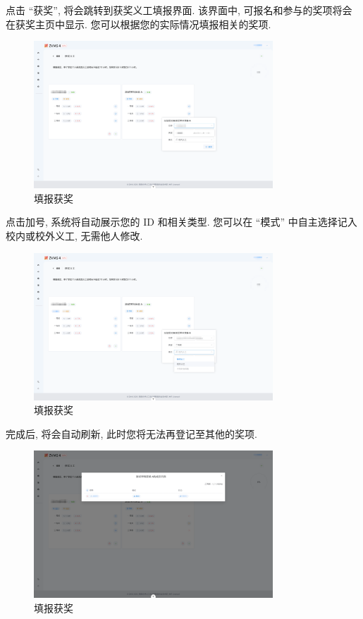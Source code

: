 \documentclass{article}
\begin{document}
点击 ``获奖'', 将会跳转到获奖义工填报界面. 该界面中, 可报名和参与的奖项将会在获奖主页中显示. 您可以根据您的实际情况填报相关的奖项.

\begin{figure}[H]
  \centering
  \includegraphics[width=0.8\textwidth]{../assets/image-20240303162655378.png}
  \caption{填报获奖}
  \label{fig:trophy}
\end{figure}

点击加号, 系统将自动展示您的 $\mathrm{ID}$ 和相关类型. 您可以在 ``模式'' 中自主选择记入校内或校外义工, 无需他人修改.

\begin{figure}[H]
  \centering
  \includegraphics[width=0.8\textwidth]{../assets/image-20240303162827568.png}
  \caption{填报获奖}
  \label{fig:trophy-add}
\end{figure}

完成后, 将会自动刷新, 此时您将无法再登记至其他的奖项.

\begin{figure}[H]
  \centering
  \includegraphics[width=0.8\textwidth]{../assets/image-20240303162940961.png}
  \caption{填报获奖}
  \label{fig:trophy-add-finish}
\end{figure}
\end{document}
